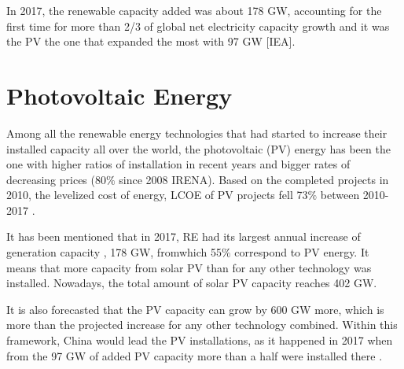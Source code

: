 In 2017, the renewable capacity added was about 178 GW, accounting for the first time for more than 2/3 of global net electricity capacity growth and it was the PV the one that expanded the most with 97 GW [IEA].



 
\section{Photovoltaic Energy}

Among all the renewable energy technologies that had started to increase their installed capacity all over the world, the photovoltaic (PV) energy has been the one with higher ratios of installation in recent years and bigger rates of decreasing prices (80$\%$ since 2008 IRENA). Based on the completed projects in 2010, the levelized cost of energy, LCOE of PV projects fell 73$\%$ between 2010-2017 \cite*{REN21}.


It has been mentioned that in 2017, RE had its largest annual increase of generation capacity \cite*{REN21}, 178 GW, fromwhich 55$\%$ correspond to PV energy. It means that more capacity from solar PV than for any other technology was installed. Nowadays, the total amount of solar PV capacity reaches 402 GW.

It is also forecasted that the PV capacity can grow by 600 GW more, which is more than the projected increase for any other technology combined. Within this framework, China would lead the PV installations, as it happened in 2017 when from the 97 GW of added PV capacity more than a half were installed there \cite*{REN21}. 

